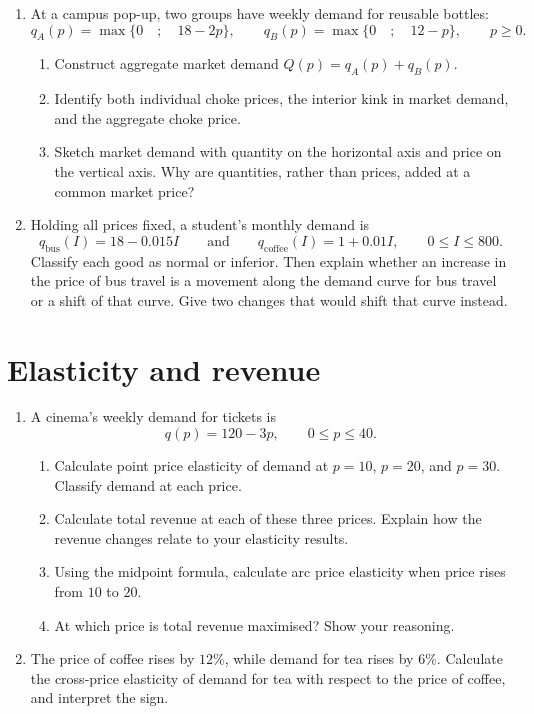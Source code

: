 \documentclass[11pt,a4paper]{article}
\begin{document}
\begin{enumerate}[label=\textbf{1.\alph*}]
  \item At a campus pop-up, two groups have weekly demand for reusable
  bottles:
  \[
    q_A(p)=\max\{0 \quad ;\quad 18-2p\},
    \qquad
    q_B(p)=\max\{0\quad ;\quad 12-p\},
    \qquad p\geq0.
  \]
  \begin{enumerate}[label=(\roman*)]
    \item Construct aggregate market demand \(Q(p)=q_A(p)+q_B(p)\).
    \item Identify both individual choke prices, the interior kink in market
    demand, and the aggregate choke price.
    \item Sketch market demand with quantity on the horizontal axis and price
    on the vertical axis. Why are quantities, rather than prices, added at a
    common market price?
  \end{enumerate}

  \item Holding all prices fixed, a student's monthly demand is
  \[
    q_{\mathrm{bus}}(I)=18-0.015I
    \qquad\text{and}\qquad
    q_{\mathrm{coffee}}(I)=1+0.01I,
    \qquad 0\leq I\leq800.
  \]
  Classify each good as normal or inferior. Then explain whether an increase
  in the price of bus travel is a movement along the demand curve for bus
  travel or a shift of that curve. Give two changes that would shift that
  curve instead.
\end{enumerate}

\section{Elasticity and revenue}

\begin{enumerate}[label=\textbf{2.\alph*}]
  \item A cinema's weekly demand for tickets is
  \[
    q(p)=120-3p,
    \qquad 0\leq p\leq40.
  \]
  \begin{enumerate}[label=(\roman*)]
    \item Calculate point price elasticity of demand at \(p=10\), \(p=20\),
    and \(p=30\). Classify demand at each price.
    \item Calculate total revenue at each of these three prices. Explain how
    the revenue changes relate to your elasticity results.
    \item Using the midpoint formula, calculate arc price elasticity when
    price rises from \(10\) to \(20\).
    \item At which price is total revenue maximised? Show your reasoning.
  \end{enumerate}

  \item The price of coffee rises by \(12\%\), while demand for tea rises by
  \(6\%\). Calculate the cross-price elasticity of demand for tea with
  respect to the price of coffee, and interpret the sign.
\end{enumerate}
\end{document}
